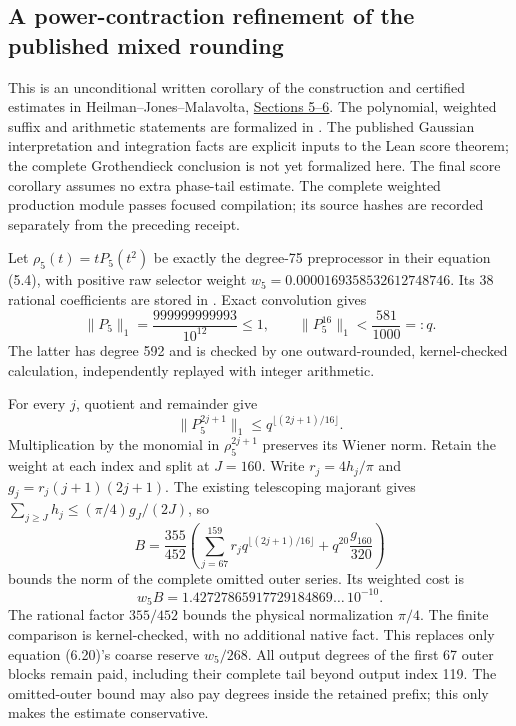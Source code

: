 \subsection{A power-contraction refinement of the published mixed rounding}

This is an unconditional written corollary of the construction and certified
estimates in Heilman--Jones--Malavolta,
\href{https://arxiv.org/html/2609.25462v1}{Sections 5--6}.
The polynomial, weighted suffix and arithmetic statements are formalized in
. The published Gaussian
interpretation and integration facts are explicit inputs to the Lean score
theorem; the complete Grothendieck conclusion is not yet formalized here.
The final score corollary assumes no extra phase-tail estimate. The complete weighted production module passes focused compilation; its source hashes are recorded separately from the preceding receipt.

Let $\rho_5(t)=tP_5(t^2)$ be exactly the degree-75 preprocessor in their
equation (5.4), with positive raw selector weight
$w_5=0.0000169358532612748746$. Its 38 rational coefficients are stored in
. Exact convolution gives
\[
 \|P_5\|_1=\frac{999999999993}{10^{12}}\le1,
 \qquad \|P_5^{16}\|_1<\frac{581}{1000}=:q.
\]
The latter has degree 592 and is checked by one outward-rounded, kernel-checked
calculation, independently replayed with integer arithmetic.

For every $j$, quotient and remainder give
\[
 \|P_5^{2j+1}\|_1\le
 q^{\lfloor(2j+1)/16\rfloor}.
\]
Multiplication by the monomial in $\rho_5^{2j+1}$ preserves its Wiener norm.
Retain the weight at each index and split at $J=160$. Write
$r_j=4h_j/\pi$ and $g_j=r_j(j+1)(2j+1)$. The existing telescoping
majorant gives $\sum_{j\ge J}h_j\le(\pi/4)g_J/(2J)$, so
\[
 B=\frac{355}{452}\left(
 \sum_{j=67}^{159}r_jq^{\lfloor(2j+1)/16\rfloor}
 +q^{20}\frac{g_{160}}{320}\right)
\]
bounds the norm of the complete omitted outer series. Its weighted cost is
\[
 w_5 B=1.42727865917729184869\ldots\,10^{-10}.
\]
The rational factor $355/452$ bounds the physical normalization $\pi/4$.
The finite comparison is kernel-checked, with no additional native fact.
This replaces only equation (6.20)'s coarse reserve $w_5/268$. All output
degrees of the first 67 outer blocks remain paid, including their complete
tail beyond output index 119. The omitted-outer bound may also pay degrees
inside the retained prefix; this only makes the estimate conservative.

